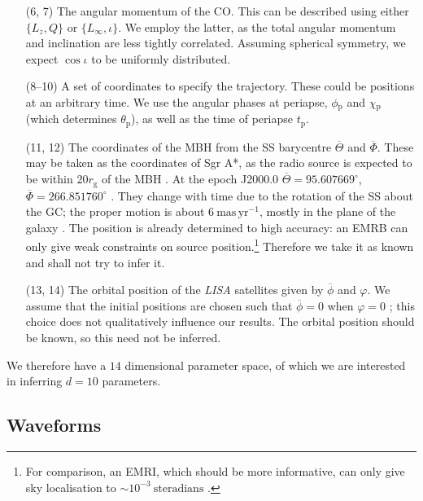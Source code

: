 \documentclass[useAMS,usedcolumn,usegraphicx,usenatbib]{mn2e}
\newcommand{\units}[1]{\ensuremath{~\mathrm{#1}}}
\newcommand{\sub}[1]{\ensuremath{_\mathrm{#1}}}
\begin{document}
\begin{enumerate}
\item[(6, 7)] The angular momentum of the CO. This can be described using either $\{L_z, Q\}$ or $\{L_\infty, \iota\}$. We employ the latter, as the total angular momentum and inclination are less tightly correlated. Assuming spherical symmetry, we expect $\cos \iota$ to be uniformly distributed.
\item[(8--10)] A set of coordinates to specify the trajectory. These could be positions at an arbitrary time. We use the angular phases at periapse, $\phi\sub{p}$ and $\chi\sub{p}$ (which determines $\theta\sub{p}$), as well as the time of periapse $t\sub{p}$.
\item[(11, 12)] The coordinates of the MBH from the SS barycentre $\overline{\Theta}$ and $\overline{\Phi}$. These may be taken as the coordinates of Sgr A*, as the radio source is expected to be within $20 r\sub{g}$ of the MBH \citep{Reid2003,Doeleman2008}. At the epoch J2000.0 $\overline{\Theta} = {95.607669}^{\circ}$, $\overline{\Phi} = {266.851760}^{\circ}$ \citep{Reid1999, Yusef-Zadeh1999}. They change with time due to the rotation of the SS about the GC; the proper motion is about $6\units{mas\,yr^{-1}}$, mostly in the plane of the galaxy \citep{Reid1999, Backer1999, Reid2003}. The position is already determined to high accuracy: an EMRB can only give weak constraints on source position.\footnote{For comparison, an EMRI, which should be more informative, can only give sky localisation to $\sim 10^{-3}~\mathrm{steradians}$ \citep{Barack2004, Huerta2009}.} Therefore we take it as known and shall not try to infer it.
\item[(13, 14)] The orbital position of the \textit{LISA} satellites given by $\overline{\phi}$ and $\varphi$. We assume that the initial positions are chosen such that $\overline{\phi} = 0$ when $\varphi = 0$ \citep{Cutler1998}; this choice does not qualitatively influence our results. The orbital position should be known, so this need not be inferred.\\
\end{enumerate}
We therefore have a $14$ dimensional parameter space, of which we are interested in inferring $d = 10$ parameters.

\subsection{Waveforms}
\end{document}
